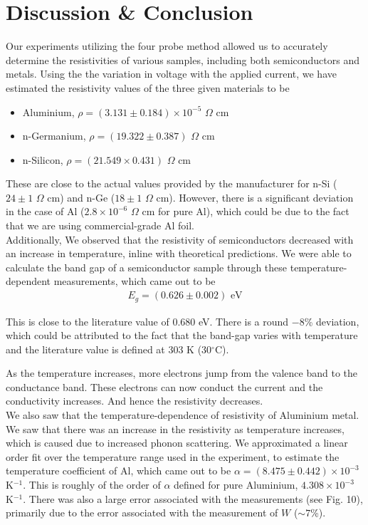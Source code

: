\section{Discussion \& Conclusion}
Our experiments utilizing the four probe method allowed us to accurately determine the resistivities of various samples, including both semiconductors and metals.
Using the the variation in voltage with the applied current, we have estimated the resistivity values of the three given materials to be

\begin{itemize}
    \item Aluminium, $\rho = (3.131 \pm 0.184) \times 10^{-5}\,\,\Omega$ cm
    \item n-Germanium, $\rho = (19.322 \pm 0.387)\,\,\Omega$ cm
    \item n-Silicon, $\rho = (21.549 \times 0.431)\,\,\Omega$ cm\\
\end{itemize}

These are close to the actual values provided by the manufacturer for n-Si ($24 \pm 1\,\,\Omega$ cm) and n-Ge ($18 \pm 1\,\,\Omega$ cm). However, there is a significant deviation in the case of Al ($2.8 \times 10^{-6}\,\,\Omega$ cm for pure Al), which could be due to the fact that we are using commercial-grade Al foil.\\

Additionally, We observed that the resistivity of semiconductors decreased with an increase in temperature, inline with theoretical predictions.
We were able to calculate the band gap of
a semiconductor sample through these temperature-dependent measurements, which came out to be 
\vspace{-1em}
\begin{align*}
    E_g = (0.626 \pm 0.002) \text{ eV}
\end{align*}

This is close to the literature value of 0.680 eV. There is a round $-8$\% deviation, which could be attributed to the fact that the band-gap varies with temperature and the literature value is defined at 303 K (30$^\circ$C).

As the temperature increases, more electrons jump from the valence band to the conductance band. These electrons can now conduct the current and the conductivity increases.
And hence the resistivity decreases.\\

We also saw that the temperature-dependence of resistivity of Aluminium metal. We saw that there was an increase in the resistivity as temperature increases, which is caused due to increased phonon scattering. We approximated a linear order fit over the temperature range used in the experiment, to estimate the temperature coefficient of Al, which came out to be $\alpha = (8.475 \pm 0.442) \times 10^{-3}$ K$^{-1}$. This is roughly of the order of $\alpha$ defined for pure Aluminium, $4.308\times 10^{-3}$ K$^{-1}$. There was also a large error associated with the measurements (see Fig. 10), primarily due to the error associated with the measurement of $W$ ($\sim 7$\%).\\

